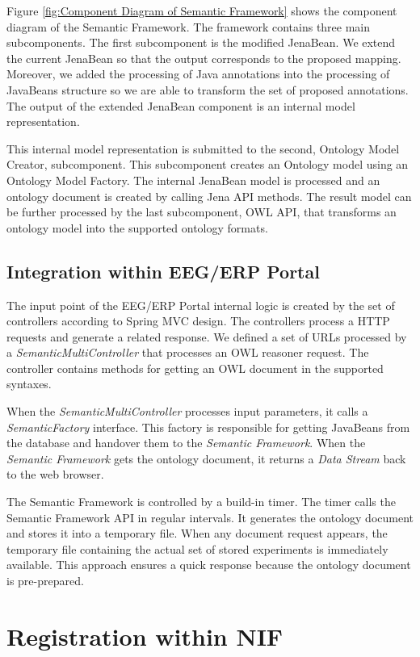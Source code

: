\documentclass[conference]{IEEEtran}
\begin{document}
Figure \ref{fig:Component Diagram of Semantic Framework} shows the component diagram of the Semantic Framework. The framework contains three main subcomponents. The first subcomponent is the modified JenaBean. We extend the current JenaBean so that the output corresponds to the proposed mapping. Moreover, we added the processing of Java annotations into the processing of JavaBeans structure so we are able to transform the set of proposed annotations. The output of the extended JenaBean component is an internal model representation.


This internal model representation is submitted to the second, Ontology Model Creator, subcomponent. This subcomponent creates an Ontology model using an Ontology Model Factory. The internal JenaBean model is processed and an ontology document is created by calling Jena API methods. The result model can be further processed by the last subcomponent, OWL API, that transforms an ontology model into the supported ontology formats.


\subsection{Integration within EEG/ERP Portal}

The input point of the EEG/ERP Portal internal logic is created by the set of controllers according to Spring MVC design. The controllers process a HTTP requests and generate a related response. We defined a set of URLs processed by a \emph{SemanticMultiController} that processes an OWL reasoner request. The controller contains methods for getting an OWL document in the supported syntaxes.

When the \emph{SemanticMultiController} processes input parameters, it calls a \emph{SemanticFactory} interface. This factory is responsible for getting JavaBeans from the database and handover them to the \emph{Semantic Framework}. When the \emph{Semantic Framework} gets the ontology document, it returns a \emph{Data Stream} back to the web browser.

The Semantic Framework is controlled by a build-in timer. The timer calls the Semantic Framework API in regular intervals. It generates the ontology document and stores it into a temporary file. When any document request appears, the temporary file containing the actual set of stored experiments is immediately available. This approach ensures a quick response because the ontology document is pre-prepared.


\section{\label{Registration within NIF}Registration within NIF}
\end{document}

